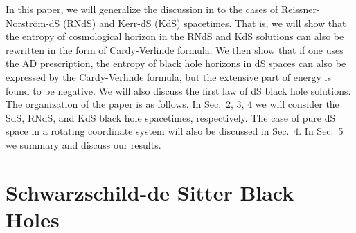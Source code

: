 \documentclass[a4paper,12pt]{article}
\providecommand{\sect}[1]{\setcounter{equation}{0}\section{#1}}
\begin{document}
In this paper, we will generalize the discussion in \cite{Cai1} to the cases of 
Reissner-Norstr\"om-dS (RNdS) and Kerr-dS (KdS) spacetimes. That is, we will show that the 
entropy of cosmological horizon in the RNdS and KdS solutions can also be rewritten in the form
of Cardy-Verlinde formula.  We then show that if one uses the AD prescription, the entropy of 
black hole horizons in dS spaces can also be expressed by the Cardy-Verlinde formula, but the 
extensive part of energy is found to be negative. We will also discuss the first law of dS 
black hole solutions. The organization of the paper is as follows. In Sec.~2, 3, 4 we will 
consider the SdS, RNdS, and KdS black hole spacetimes, respectively. The case of pure dS space
in a rotating coordinate system  will also be discussed in Sec.~4.
In Sec.~5 we summary  and discuss our results. 
 


\sect{Schwarzschild-de Sitter Black Holes }
\end{document}
